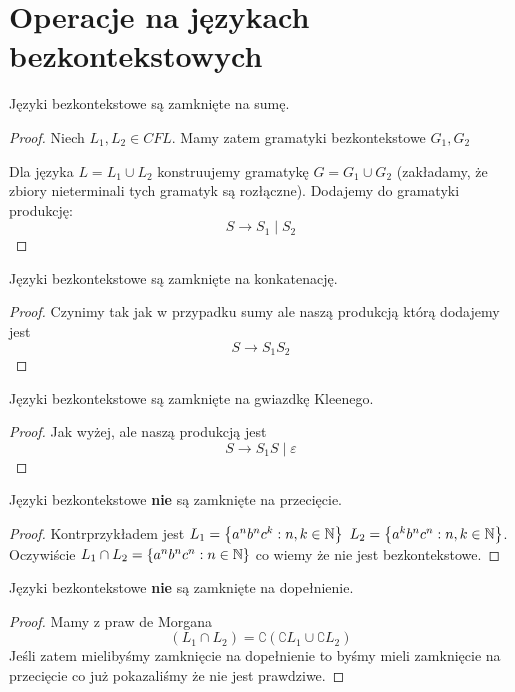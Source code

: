 \section{Operacje na językach bezkontekstowych}

\begin{theorem}
    Języki bezkontekstowe są zamknięte na sumę.
\end{theorem}
\begin{proof}
    Niech \( L_1, L_2 \in CFL \). Mamy zatem gramatyki bezkontekstowe \( G_1, G_2 \)
    
    Dla języka \( L = L_1 \cup L_2 \) konstruujemy gramatykę \( G = G_1 \cup G_2 \) (zakładamy, że zbiory nieterminali tych gramatyk są rozłączne).
    Dodajemy do gramatyki produkcję:
    \[
        S \rightarrow S_1 \mid S_2
    \]
\end{proof}

\begin{theorem}
    Języki bezkontekstowe są zamknięte na konkatenację.
\end{theorem}
\begin{proof}
    Czynimy tak jak w przypadku sumy ale naszą produkcją którą dodajemy jest
    \[
        S \rightarrow S_1S_2
    \]
\end{proof}

\begin{theorem}
    Języki bezkontekstowe są zamknięte na gwiazdkę Kleenego.
\end{theorem}
\begin{proof}
    Jak wyżej, ale naszą produkcją jest 
    \[
        S \rightarrow S_1S \mid \varepsilon
    \]
\end{proof}


\begin{theorem}
    Języki bezkontekstowe \textbf{nie} są zamknięte na przecięcie.
\end{theorem}
\begin{proof}
    Kontrprzykładem jest \( L_1 = \set{a^nb^nc^k : n, k \in \natural} \) \( L_2 = \set{a^kb^nc^n : n, k \in \natural} \).
    Oczywiście \( L_1 \cap L_2 = \set{a^nb^nc^n : n \in \natural} \) co wiemy że nie jest bezkontekstowe.
\end{proof}


\begin{theorem}
    Języki bezkontekstowe \textbf{nie} są zamknięte na dopełnienie.
\end{theorem}
\begin{proof}
    Mamy z praw de Morgana
    \[
        (L_1 \cap L_2) = \complement{(\complement{L_1} \cup \complement{L_2})}
    \]
    Jeśli zatem mielibyśmy zamknięcie na dopełnienie to byśmy mieli zamknięcie na przecięcie co już pokazaliśmy że nie jest prawdziwe.
\end{proof}